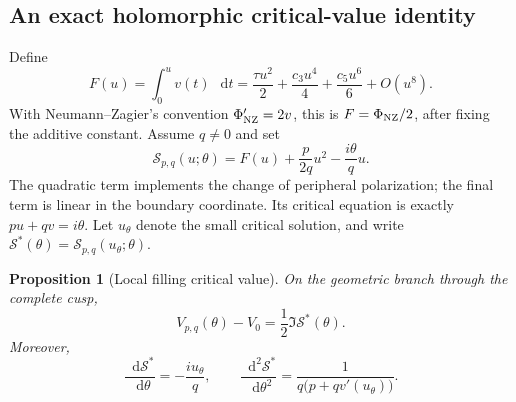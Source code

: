 \documentclass[11pt,a4paper]{article}
\numberwithin{equation}{section}
\newtheorem{proposition}[theorem]{Proposition}
\theoremstyle{definition}
\theoremstyle{remark}
\newcommand{\dd}{\mathop{}\!\mathrm d}
\begin{document}
\subsection{An exact holomorphic critical-value identity}

Define
\begin{equation}
 F(u)=\int_0^u v(t)\,\dd t
     =\frac{\tau u^2}{2}+\frac{c_3u^4}{4}
        +\frac{c_5u^6}{6}+O(u^8).
 \label{eq:dehnprimitive}
\end{equation}
With Neumann--Zagier's convention $\Phi_{\rm NZ}'=2v$,
this is $F=\Phi_{\rm NZ}/2$, after fixing the additive constant.
Assume $q\ne0$ and set
\begin{equation}
 \boxed{
 \mathcal S_{p,q}(u;\theta)
       =F(u)+\frac{p}{2q}u^2-\frac{i\theta}{q}u.}
 \label{eq:dehnsurgeryaction}
\end{equation}
The quadratic term implements the change of peripheral polarization;
the final term is linear in the boundary coordinate. Its critical
equation is exactly $pu+qv=i\theta$. Let $u_\theta$ denote the small
critical solution, and write
$\mathcal S^*(\theta)=\mathcal S_{p,q}(u_\theta;\theta)$.

\begin{proposition}[Local filling critical value]
\label{prop:dehncriticalvalue}
On the geometric branch through the complete cusp,
\begin{equation}
 \boxed{V_{p,q}(\theta)-V_0=\frac12\Im\mathcal S^*(\theta).}
 \label{eq:dehnexactcriticalvolume}
\end{equation}
Moreover,
\begin{equation}
 \frac{\dd\mathcal S^*}{\dd\theta}=-\frac{i u_\theta}{q},\qquad
 \frac{\dd^2\mathcal S^*}{\dd\theta^2}
       =\frac{1}{q\bigl(p+qv'(u_\theta)\bigr)}.
 \label{eq:dehnenvelope}
\end{equation}
\end{proposition}
\end{document}
